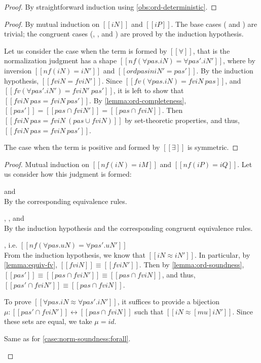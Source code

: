 \obsNormDeterministic*
\begin{proof}
  By straightforward induction using \cref{obs:ord-deterministic}.
\end{proof}


\lemmaFvNf*
\begin{proof}
  By mutual induction on $[[iN]]$ and $[[iP]]$.
  The base cases 
  ( and )
  are trivial; the congruent cases
  (,
  , and
  ) are proved by the induction hypothesis.

  Let us consider the case when the term is formed by $[[∀]]$,
  that is the normalization judgment has a shape 
  $[[nf(∀pas.iN) = ∀pas'.iN']]$,
  where by inversion $[[nf(iN) = iN']]$
  and $[[ord {pas} in iN' = pas']]$.
  By the induction hypothesis, $[[fv iN = fv iN']]$.
  Since $[[fv(∀pas.iN) = fv iN \ {pas}]]$,
  and $[[fv(∀pas'.iN') = fv iN' \ {pas'}]]$,
  it is left to show that $[[fv iN \ {pas} = fv iN \ {pas'}]]$.
  By \cref{lemma:ord-completeness}, 
  $[[{pas'}]] = [[{pas} ∩ fv iN']] = [[{pas} ∩ fv iN]]$.
  Then
  $[[fv iN \ {pas} = fv iN \ ({pas} ∪ fv iN)]]$ by
  set-theoretic properties, and
  thus, $[[fv iN \ {pas} = fv iN \ {pas'}]]$.

  The case when the term is positive and formed by $[[∃]]$ is symmetric.
\end{proof}

\lemmaNormSoundness*
\begin{proof}
  Mutual induction on $[[nf(iN) = iM]]$ and $[[nf(iP) = iQ]]$.
  Let us consider how this judgment is formed:
  \begin{caseof}
    \item{\nameref{\ottdruleNrmNVarLabel} and \nameref{\ottdruleNrmPVarLabel}}\\ By
      the corresponding equivalence rules.
    \item{\nameref{\ottdruleNrmShiftULabel}, \nameref{\ottdruleNrmShiftDLabel},
        and \nameref{\ottdruleNrmArrowLabel}}\\
      By the induction hypothesis and the corresponding congruent equivalence rules.
    \item{\nameref{\ottdruleNrmForallLabel}}, i.e. $[[nf(∀pas.uN) = ∀pas'.uN']]$ \label{case:norm-soundness:forall}\\
      From the induction hypothesis, we
      know that $[[iN ≈ iN']]$. In particular, by \cref{lemma:equiv-fv}, $[[fv
        iN]] \equiv [[fv iN']]$.
      Then by \cref{lemma:ord-soundness}, $[[{pas'}]]
      \equiv [[{pas} ∩ fv iN']] \equiv [[{pas} ∩ fv iN]]$, and thus,
      $[[{pas'} ∩ fv iN']] \equiv [[{pas} ∩ fv iN]]$.
      
      To prove $[[∀pas.iN ≈ ∀pas'.iN']]$, it suffices to provide a bijection 
      $\mu : [[{pas'} ∩ fv iN']] \leftrightarrow [[{pas} ∩ fv iN]]$ such that
      $[[iN ≈ [mu]iN']]$. Since these sets are equal, we take $\mu = id$.
    \item{\nameref{\ottdruleNrmExistsLabel}} Same as for \cref{case:norm-soundness:forall}.
  \end{caseof}
\end{proof}

